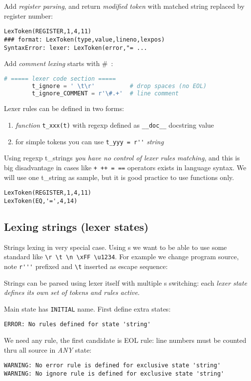 Add \emph{register parsing}, and return \textit{modified token} with matched
string replaced by register number:

\begin{lstlisting}
LexToken(REGISTER,1,4,11)
### format: LexToken(type,value,lineno,lexpos)
SyntaxError: lexer: LexToken(error,"= ...
\end{lstlisting}

Add \emph{comment lexing} starts with \#\ : \label{lexcomment}
\begin{lstlisting}[language=python]
		# ===== lexer code section =====
		t_ignore = ' \t\r'			# drop spaces (no EOL)
		t_ignore_COMMENT = r'\#.+'	# line comment
\end{lstlisting}

\clearpage
Lexer rules can be defined in two forms:
\begin{enumerate}[nosep]
  \item \emph{function} \verb|t_xxx(t)| with regexp defined as \verb|__doc__|
  docstring value
  \item for simple tokens you can use \verb|t_yyy = r''| \emph{string}
\end{enumerate}

Using regexp t\_strings \emph{you have no control of lexer rules matching}, and
this is big disadvantage in cases like \verb|+ ++ = ==| operators exists in
language syntax. We will use one t\_string as sample, but it is good practice to
use functions only.

\begin{lstlisting}
LexToken(REGISTER,1,4,11)
LexToken(EQ,'=',4,14)
\end{lstlisting}

\subsection{Lexing strings (lexer states)}\label{lexstring}

Strings lexing in very special case. Using s we want to be
able to use some standard  like
\verb|\r \t \n \xFF \u1234|. For example we change program source, note
\verb|r'''| prefixed and \verb|\t| inserted
as escape sequence:

Strings can be parsed using lexer itself with multiple s
switching: each \emph{lexer state defines its own set of tokens and rules
active}.

Main state has \verb|INITIAL| name. First define extra states:

\begin{lstlisting}
ERROR: No rules defined for state 'string'
\end{lstlisting}
We need any rule, the first candidate is EOL rule: line numbers
must be counted thru all source in \emph{ANY} state:

\begin{lstlisting}
WARNING: No error rule is defined for exclusive state 'string'
WARNING: No ignore rule is defined for exclusive state 'string'
\end{lstlisting}


